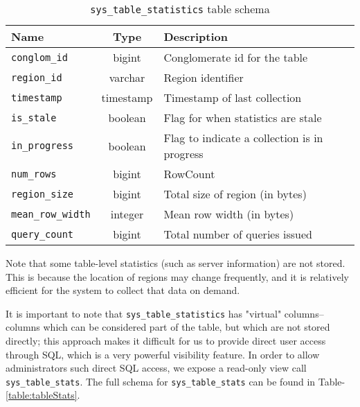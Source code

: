 \begin{table}
				\begin{tabular}{|l|c|p{6cm}|}
								\hline
								\bf{Name}									& \bf{Type}	&	\bf{Description} \\ \hline	
								\texttt{conglom\_id}			&	bigint		&	Conglomerate id for the table \\ \hline
								\texttt{region\_id}				&	varchar		&	Region identifier \\ \hline
								\texttt{timestamp}				& timestamp	&	Timestamp of last collection \\ \hline	
								\texttt{is\_stale}				&	boolean		&	Flag for when statistics are stale \\ \hline
								\texttt{in\_progress}			&	boolean		&	Flag to indicate a collection is in progress \\ \hline
								\texttt{num\_rows}				&	bigint		& RowCount \\ \hline
								\texttt{region\_size}			&	bigint		&	Total size of region (in bytes) \\ \hline
								\texttt{mean\_row\_width}	&	integer		&	Mean row width (in bytes) \\ \hline
								\texttt{query\_count}			&	bigint		&	Total number of queries issued \\ \hline
				\end{tabular}
				\caption{\texttt{sys\_table\_statistics} table schema}
				\label{table:tableStatistics}
\end{table}

Note that some table-level statistics (such as server information) are not stored. This is because the location of regions may change frequently, and it is relatively efficient for the system to collect that data on demand.

It is important to note that \texttt{sys\_table\_statistics} has "virtual" columns--columns which can be considered part of the table, but which are not stored directly; this approach makes it difficult for us to provide direct user access through SQL, which is a very powerful visibility feature. In order to allow administrators such direct SQL access, we expose a read-only view call \texttt{sys\_table\_stats}. The full schema for \texttt{sys\_table\_stats} can be found in Table-\ref{table:tableStats}.

